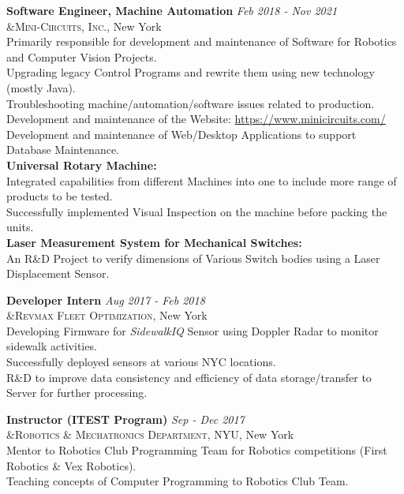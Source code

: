 \documentclass[a4paper,10pt]{article}
\begin{document}
\textbf{Software Engineer, Machine Automation} \hfill \emph {Feb 2018 - Nov 2021}\\
 &\textsc{Mini-Circuits, Inc.}, New York\\
 \textbullet{} Primarily responsible for development and maintenance of Software for Robotics and Computer Vision Projects.\\
  \textbullet{} Upgrading legacy Control Programs and rewrite them using new technology (mostly Java).\\
  \textbullet{} Troubleshooting machine/automation/software issues related to production.\\
 \textbullet{} Development and maintenance of the Website: \href{https://www.minicircuits.com/}{https://www.minicircuits.com/}\\
 \textbullet{} Development and maintenance of Web/Desktop Applications to support Database Maintenance.\\
 \textbullet{} \textbf{Universal Rotary Machine:}\\
 \textbullet{} Integrated capabilities from different Machines into one to include more range of products to be tested.\\
  \textbullet{} Successfully implemented Visual Inspection on the machine before packing the units.\\
  \textbullet{} \textbf{Laser Measurement System for Mechanical Switches:}\\
  \textbullet{} An R\&D Project to verify dimensions of Various Switch bodies using a Laser Displacement Sensor.
  
 
\textbf{Developer Intern} \hfill \emph {Aug 2017 - Feb 2018}\\
 &\textsc{Revmax Fleet Optimization}, New York\\
 \textbullet{} Developing Firmware for \emph{SidewalkIQ} Sensor using Doppler Radar to monitor sidewalk activities.\\
 \textbullet{} Successfully deployed sensors at various NYC locations.\\
 \textbullet{} R\&D to improve data consistency and efficiency of data storage/transfer to Server for further processing.
 
\textbf{Instructor (ITEST Program)} \hfill \emph {Sep - Dec 2017}\\
 &\textsc{Robotics \& Mechatronics Department, NYU}, New York\\
 \textbullet{} Mentor to Robotics Club Programming Team for Robotics competitions (First Robotics \& Vex Robotics).\\
 \textbullet{} Teaching concepts of Computer Programming to Robotics Club Team.
 
\end{document}
